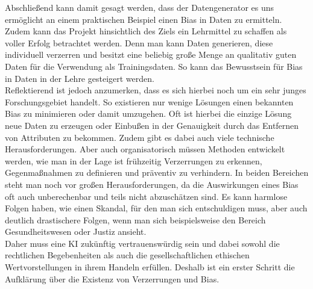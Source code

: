 \begin{onehalfspace}
Abschließend kann damit gesagt werden, dass der Datengenerator es uns ermöglicht an einem praktischen Beispiel einen Bias in Daten zu ermitteln. Zudem kann das Projekt hinsichtlich des Ziels ein Lehrmittel zu schaffen als voller Erfolg betrachtet werden. Denn man kann Daten generieren, diese individuell verzerren und besitzt eine beliebig große Menge an qualitativ guten Daten für die Verwendung als Trainingsdaten. So kann das Bewusstsein für Bias in Daten in der Lehre gesteigert werden.\\
Reflektierend ist jedoch anzumerken, dass es sich hierbei noch um ein sehr junges Forschungsgebiet handelt. So existieren nur wenige Lösungen einen bekannten Bias zu minimieren oder damit umzugehen. Oft ist hierbei die einzige Lösung neue Daten zu erzeugen oder Einbußen in der Genauigkeit durch das Entfernen von Attributen zu bekommen. Zudem gibt es dabei auch viele technische Herausforderungen. Aber auch organisatorisch müssen Methoden entwickelt werden, wie man in der Lage ist frühzeitig Verzerrungen zu erkennen, Gegenmaßnahmen zu definieren und präventiv zu verhindern. In beiden Bereichen steht man noch vor großen Herausforderungen, da die Auswirkungen eines Bias oft auch unberechenbar und teils nicht abzuschätzen sind. Es kann harmlose Folgen haben, wie einen Skandal, für den man sich entschuldigen muss, aber auch deutlich drastischere Folgen, wenn man sich beispielsweise den Bereich Gesundheitswesen oder Justiz ansieht.\\
Daher muss eine KI zukünftig vertrauenswürdig sein und dabei sowohl die rechtlichen Begebenheiten als auch die gesellschaftlichen ethischen Wertvorstellungen in ihrem Handeln erfüllen. Deshalb ist ein erster Schritt die Aufklärung über die Existenz von Verzerrungen und Bias.
\newpage

\end{onehalfspace}
